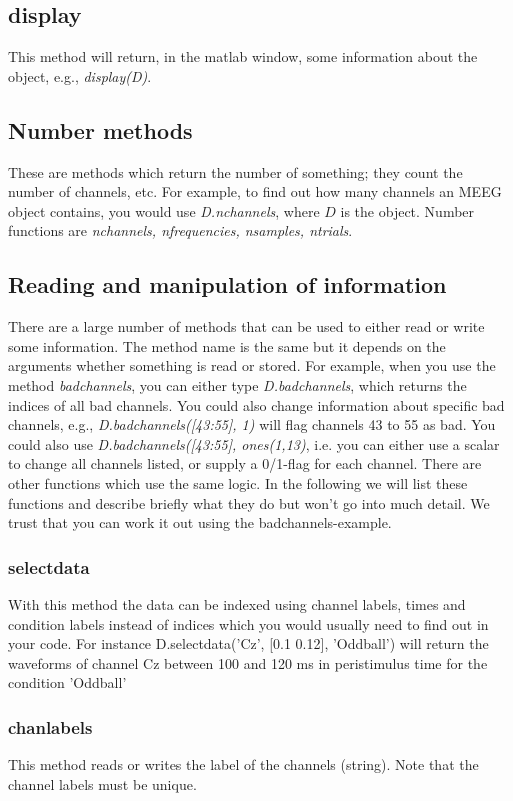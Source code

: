 \subsection{display}
This method will return, in the matlab window, some information about
the object, e.g., \textit{display(D)}. 

\subsection{Number methods}
These are methods which return the number of something; they count the
number of channels, etc. For example, to find out how many channels an
MEEG object contains, you would use \textit{D.nchannels}, where $D$ is the
object. Number functions are \textit{nchannels, nfrequencies, nsamples,
  ntrials}.

\subsection{Reading and manipulation of information}
There are a large number of methods that can be used to either read or
write some information. The method name is the same but it depends on
the arguments whether something is read or stored. For example, when
you use the method \textit{badchannels}, you can either type
\textit{D.badchannels}, which returns the indices of all bad channels. You
could also change information about specific bad channels, e.g.,
\textit{D.badchannels([43:55], 1)} will flag channels 43 to 55 as
bad. You 
  could also use \textit{D.badchannels([43:55], ones(1,13)}, i.e. you
  can 
  either use a scalar to change all channels listed, or supply a
  0/1-flag for each channel. There are other functions which use the
  same logic. In the following we will list these functions and
  describe briefly what they do but won't go into much detail. We
  trust that you can work it out using the badchannels-example. 

\subsubsection{selectdata}
With this method the data can be indexed using channel labels, times and
condition labels instead of indices which you would usually need to find out
in your code. For instance D.selectdata('Cz', [0.1 0.12], 'Oddball') will return
the waveforms of channel Cz between 100 and 120 ms in peristimulus time for the
condition 'Oddball'

\subsubsection{chanlabels}
This method reads or writes the label of the channels (string).  Note that
the channel labels must be unique.

